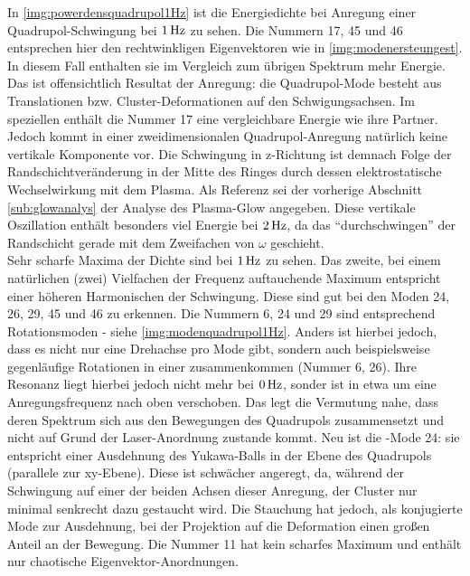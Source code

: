           In \autoref{img:powerdensquadrupol1Hz} ist die Energiedichte bei Anregung einer Quadrupol-Schwingung bei $\unit[1]{Hz}$ zu sehen. Die Nummern 17, 45 und 46 entsprechen hier den rechtwinkligen Eigenvektoren wie in \autoref{img:modenersteungest}. In diesem Fall enthalten sie im Vergleich zum übrigen Spektrum mehr Energie. Das ist offensichtlich Resultat der Anregung: die Quadrupol-Mode besteht aus Translationen bzw. Cluster-Deformationen auf den Schwigungsachsen. Im speziellen enthält die Nummer 17 eine vergleichbare Energie wie ihre Partner. Jedoch kommt in einer zweidimensionalen Quadrupol-Anregung natürlich keine vertikale Komponente vor. Die Schwingung in z-Richtung ist demnach Folge der Randschichtveränderung in der Mitte des Ringes durch dessen elektrostatische Wechselwirkung mit dem Plasma. Als Referenz sei der vorherige Abschnitt \ref{sub:glowanalys} der Analyse des Plasma-Glow angegeben. Diese vertikale Oszillation enthält besonders viel Energie bei $\unit[2]{Hz}$, da das "`durchschwingen"' der Randschicht gerade mit dem Zweifachen von $\omega$ geschieht.\\
          Sehr scharfe Maxima der Dichte sind bei $\unit[1]{Hz}$ zu sehen. Das zweite, bei einem natürlichen (zwei) Vielfachen der Frequenz auftauchende Maximum entspricht einer höheren Harmonischen der Schwingung. Diese sind gut bei den Moden 24, 26, 29, 45 und 46 zu erkennen. Die Nummern 6, 24 und 29 sind entsprechend Rotationsmoden - siehe \autoref{img:modenquadrupol1Hz}. Anders ist hierbei jedoch, dass es nicht nur eine Drehachse pro Mode gibt, sondern auch beispielsweise gegenläufige Rotationen in einer zusammenkommen (Nummer 6, 26). Ihre Resonanz liegt hierbei jedoch nicht mehr bei $\unit[0]{Hz}$, sonder ist in etwa um eine Anregungsfrequenz nach oben verschoben. Das legt die Vermutung nahe, dass deren Spektrum sich aus den Bewegungen des Quadrupols zusammensetzt und nicht auf Grund der Laser-Anordnung zustande kommt. Neu ist die -Mode 24: sie entspricht einer Ausdehnung des Yukawa-Balls in der Ebene des Quadrupols (parallele zur xy-Ebene). Diese ist schwächer angeregt, da, während der Schwingung auf einer der beiden Achsen dieser Anregung, der Cluster nur minimal senkrecht dazu gestaucht wird. Die Stauchung hat jedoch, als konjugierte Mode zur Ausdehnung, bei der Projektion auf die Deformation einen großen Anteil an der Bewegung. Die Nummer 11 hat kein scharfes Maximum und enthält nur chaotische Eigenvektor-Anordnungen.

